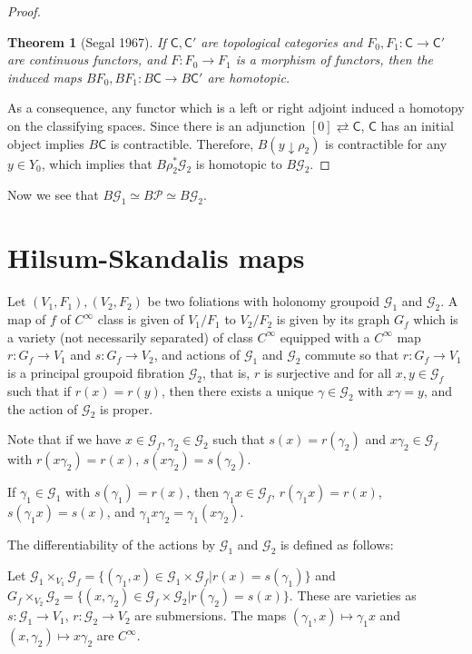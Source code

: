 \documentclass[12pt]{amsart}
\newtheorem{thm}{Theorem}[section]
\theoremstyle{definition}
\theoremstyle{remark}
\numberwithin{equation}{section}
\newcommand{\CC}{{\mathsf C}}
\newcommand{\CG}{{\mathcal G}}
\newcommand{\CP}{{\mathcal P}}
\begin{document}
\begin{proof}
\begin{thm}[Segal 1967]
		If $\CC, \CC'$ are topological categories and $F_0, F_1: \CC \to \CC'$ are  continuous functors, 
and $F:F_0\to F_1$ is a morphism of functors, then the induced maps $BF_0, BF_1: B\CC \to B\CC'$ are homotopic.
\end{thm}
As a consequence, any functor which is a  left or right adjoint induced a homotopy on the classifying spaces. Since there is an adjunction $[0] \rightleftarrows \CC$, $\CC$ has an initial object implies $B\CC$ is contractible.
Therefore, $B(y\downarrow\rho_2)$ is contractible for any $y\in Y_0$, which implies that $B\rho_2^*\CG_2$ is homotopic to $B\CG_2$.
	\end{proof}

Now we see that $B\CG_1\simeq B\CP \simeq B\CG_2$.
\section{Hilsum-Skandalis maps}
Let $(V_1,F_1), (V_2,F_2)$ be two foliations with  holonomy groupoid $\CG_1$ and $\CG_2$. A map of $f$ of $C^{\infty}$ class is given of $V_1/F_1$ to $V_2/F_2$ is given by its graph $G_f$ which is a variety (not necessarily separated) of class $C^{\infty}$ equipped with a $C^{\infty}$ map $r:G_f \to V_1$ and $s:G_f \to V_2$, and actions of $\CG_1$ and $\CG_2$ commute so that $r:G_f \to V_1$ is a principal groupoid fibration $\CG_2$, that is, $r$ is surjective and for all $x,y\in \CG_f$ such that if $r(x)=r(y)$, then there exists a unique $\gamma\in \CG_2$ with $x\gamma=y$, and the action of $\CG_2$ is proper.

Note that if we have $x\in \CG_f, \gamma_2 \in \CG_2$ such that $s(x)=r(\gamma_2)$ and $x\gamma_2\in \CG_f$ with $r(x\gamma_2)=r(x)$, $s(x\gamma_2)=s(\gamma_2)$.

If $\gamma_1 \in \CG_1$ with $s(\gamma_1)=r(x)$, then  $\gamma_1 x\in \CG_f$, $r(\gamma_1 x)=r(x)$, $s(\gamma_1x)=s(x)$, and $\gamma_1x\gamma_2=\gamma_1(x\gamma_2)$.

The differentiability of the actions by $\CG_1$ and $\CG_2$ is defined as follows:

Let $\CG_1 \times_{V_1} \CG_f=\{(\gamma_1,x)\in \CG_1 \times \CG_f| r(x)=s(\gamma_1) \}$ and $ G_f\times_{V_2}\CG_2 =\{(x,\gamma_2)\in \CG_f \times \CG_2| r(\gamma_2)=s(x) \}$. These are varieties as $s:\CG_1 \to V_1$, $r:\CG_2 \to V_2$ are submersions. The maps $(\gamma_1,x)\mapsto \gamma_1x$ and $(x,\gamma_2) \mapsto x\gamma_2$ are $C^{\infty}$.
\end{document}
